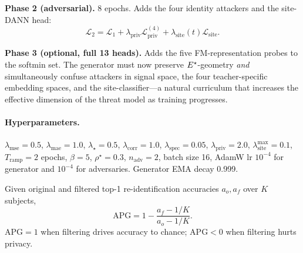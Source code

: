 \textbf{Phase 2 (adversarial).} 8 epochs. Adds the four identity attackers and the site-DANN head:
\begin{equation}
\mathcal{L}_2 = \mathcal{L}_1 + \lambda_{\text{priv}}\mathcal{L}_{\text{priv}}^{(4)} + \lambda_{\text{site}}(t)\mathcal{L}_{\text{site}}.
\end{equation}

\textbf{Phase 3 (optional, full 13 heads).} Adds the five FM-representation probes to the softmin set. The generator must now preserve $E^{\star}$-geometry \emph{and} simultaneously confuse attackers in signal space, the four teacher-specific embedding spaces, and the site-classifier---a natural curriculum that increases the effective dimension of the threat model as training progresses.

\paragraph{Hyperparameters.} $\lambda_{\text{mse}}\!=\!0.5$, $\lambda_{\text{mae}}\!=\!1.0$, $\lambda_\star\!=\!0.5$, $\lambda_{\text{corr}}\!=\!1.0$, $\lambda_{\text{spec}}\!=\!0.05$, $\lambda_{\text{priv}}\!=\!2.0$, $\lambda_{\text{site}}^{\max}\!=\!0.1$, $T_{\text{ramp}}\!=\!2$ epochs, $\beta\!=\!5$, $\rho^\star\!=\!0.3$, $n_{\text{adv}}\!=\!2$, batch size 16, AdamW lr $10^{-4}$ for generator and $10^{-4}$ for adversaries. Generator EMA decay 0.999.

\begin{definition}
\label{def:apg}
Given original and filtered top-1 re-identification accuracies $a_o,a_f$ over $K$ subjects,
\begin{equation*}
\mathrm{APG} = 1 - \frac{a_f - 1/K}{a_o - 1/K}.
\end{equation*}
$\mathrm{APG}\!=\!1$ when filtering drives accuracy to chance; $\mathrm{APG}\!<\!0$ when filtering hurts privacy.
\end{definition}
